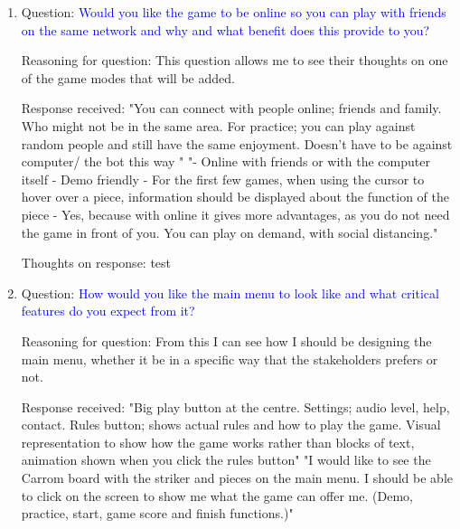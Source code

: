 \documentclass[11pt,a4paper]{report}
\begin{document}
\begin{enumerate}
    \colorbox{l-red}{Response received:} \noindent \textcolor{crimson-red}{"Yes, I have played 8 ball pool and Golf before." \newline "Yes, I have played Wii Sports on Nintendo and Golf before."}

    \colorbox{l-purple}{Thoughts on response:} \noindent \textcolor{d-purple}{test}



    \item \colorbox{l-blue}{Question:} \textcolor{blue}{Would you like the game to be online so you can play with friends on the same network and why and what benefit does this provide to you?}

    \colorbox{l-green}{Reasoning for question:} \textcolor{dark-green}{This question allows me to see their thoughts on one of the game modes that will be added.}

    \colorbox{l-red}{Response received:} \noindent \textcolor{crimson-red}{"You can connect with people online; friends and family. Who might not be in the same area. For practice; you can play against random people and still have the same enjoyment. Doesn't have to be against computer/ the bot this way " \newline "- Online with friends or with the computer itself
- Demo friendly
- For the first few games, when using the cursor to hover over a piece, information should be displayed about the function of the piece
- Yes, because with online it gives more advantages, as you do not need the game in front of you. You can play on demand, with social distancing."}

    \colorbox{l-purple}{Thoughts on response:} \noindent \textcolor{d-purple}{test}



    \item \colorbox{l-blue}{Question:} \textcolor{blue}{How would you like the main menu to look like and what critical features do you expect from it?}

    \colorbox{l-green}{Reasoning for question:} \textcolor{dark-green}{From this I can see how I should be designing the main menu, whether it be in a specific way that the stakeholders prefers or not.}

    \colorbox{l-red}{Response received:} \noindent \textcolor{crimson-red}{"Big play button at the centre. Settings; audio level, help, contact. Rules button; shows actual rules and how to play the game. Visual representation to show how the game works rather than blocks of text, animation shown when you click the rules button" \newline "I would like to see the Carrom board with the striker and pieces on the main menu.
I should be able to click on the screen to show me what the game can offer me. (Demo, practice, start, game score and finish functions.)"}


\end{enumerate}
\end{document}
